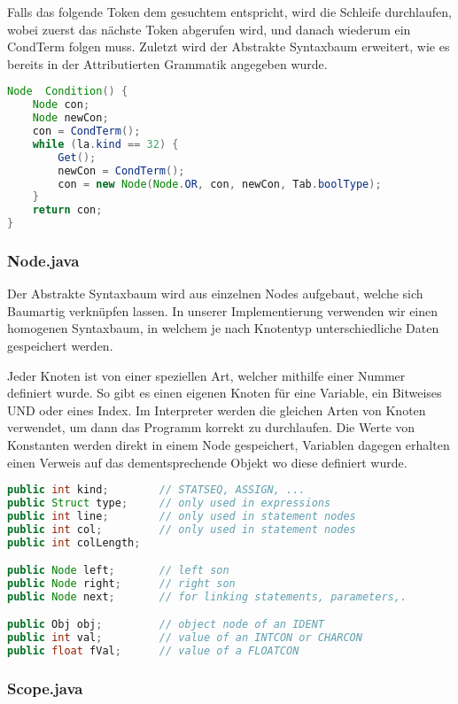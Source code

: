 Falls das folgende Token dem gesuchtem entspricht, wird die Schleife durchlaufen, wobei zuerst das n\"achste Token abgerufen wird, und danach wiederum ein CondTerm folgen muss. Zuletzt wird der Abstrakte Syntaxbaum erweitert, wie es bereits in der Attributierten Grammatik angegeben wurde.

\begin{lstlisting}[language=Java]
Node  Condition() {
	Node con;
	Node newCon; 
	con = CondTerm();
	while (la.kind == 32) {
		Get();
		newCon = CondTerm();
		con = new Node(Node.OR, con, newCon, Tab.boolType); 
	}
	return con;
}
\end{lstlisting}

\subsubsection{Node.java}

Der Abstrakte Syntaxbaum wird aus einzelnen Nodes aufgebaut, welche sich Baumartig verkn\"upfen lassen. In unserer Implementierung verwenden wir einen homogenen Syntaxbaum, in welchem je nach Knotentyp unterschiedliche Daten gespeichert werden.

Jeder Knoten ist von einer speziellen Art, welcher mithilfe einer Nummer definiert wurde. So gibt es einen eigenen Knoten f\"ur eine Variable, ein Bitweises UND oder eines Index. Im Interpreter werden die gleichen Arten von Knoten verwendet, um dann das Programm korrekt zu durchlaufen. Die Werte von Konstanten werden direkt in einem Node gespeichert, Variablen dagegen erhalten einen Verweis auf das dementsprechende Objekt wo diese definiert wurde.

\begin{lstlisting}[language=Java]
public int kind;        // STATSEQ, ASSIGN, ...
public Struct type;     // only used in expressions
public int line;        // only used in statement nodes
public int col;         // only used in statement nodes
public int colLength;

public Node left;       // left son
public Node right;      // right son
public Node next;       // for linking statements, parameters,.

public Obj obj;         // object node of an IDENT
public int val;         // value of an INTCON or CHARCON
public float fVal;      // value of a FLOATCON
\end{lstlisting}

\subsubsection{Scope.java}


